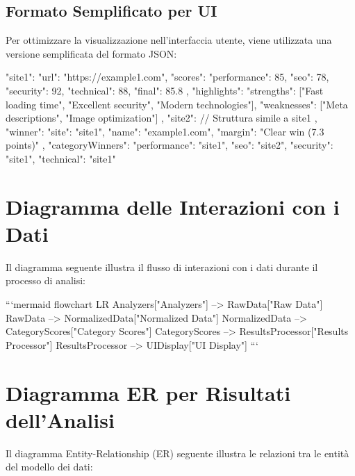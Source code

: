 \subsection{Formato Semplificato per UI}
Per ottimizzare la visualizzazione nell'interfaccia utente, viene utilizzata una versione semplificata del formato JSON:

\begin{asciiart}
{
  "site1": {
    "url": "https://example1.com",
    "scores": {
      "performance": 85,
      "seo": 78,
      "security": 92,
      "technical": 88,
      "final": 85.8
    },
    "highlights": {
      "strengths": ["Fast loading time", "Excellent security", "Modern technologies"],
      "weaknesses": ["Meta descriptions", "Image optimization"]
    }
  },
  "site2": {
    // Struttura simile a site1
  },
  "winner": {
    "site": "site1",
    "name": "example1.com",
    "margin": "Clear win (7.3 points)"
  },
  "categoryWinners": {
    "performance": "site1",
    "seo": "site2",
    "security": "site1",
    "technical": "site1"
  }
}
\end{asciiart}

\section{Diagramma delle Interazioni con i Dati}
Il diagramma seguente illustra il flusso di interazioni con i dati durante il processo di analisi:

```mermaid
flowchart LR
    Analyzers["Analyzers"] --> RawData["Raw Data"]
    RawData --> NormalizedData["Normalized Data"]
    NormalizedData --> CategoryScores["Category Scores"]
    CategoryScores --> ResultsProcessor["Results Processor"]
    ResultsProcessor --> UIDisplay["UI Display"]
```


\section{Diagramma ER per Risultati dell'Analisi}
Il diagramma Entity-Relationship (ER) seguente illustra le relazioni tra le entità del modello dei dati:

